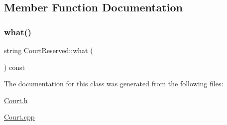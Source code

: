 \subsection{Member Function Documentation}
\mbox{\label{class_court_reserved_a3f86a29ee125b95d68c4ee9ea6163e4e}} 
\subsubsection{\texorpdfstring{what()}{what()}}
{\footnotesize\ttfamily string Court\+Reserved\+::what (\begin{DoxyParamCaption}{ }\end{DoxyParamCaption}) const}



The documentation for this class was generated from the following files\+:\begin{DoxyCompactItemize}
\item 
\mbox{\hyperlink{_court_8h}{Court.\+h}}\item 
\mbox{\hyperlink{_court_8cpp}{Court.\+cpp}}\end{DoxyCompactItemize}
